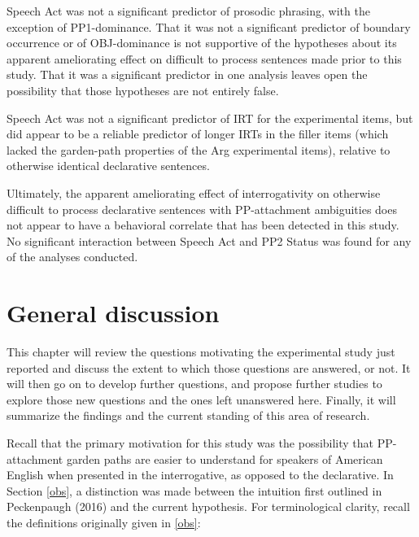 \documentclass[11pt,oneside]{book}
\begin{document}
Speech Act was not a significant predictor of prosodic phrasing, with the exception of PP1-dominance. That it was not a significant predictor of boundary occurrence or of OBJ-dominance is not supportive of the hypotheses about its apparent ameliorating effect on difficult to process sentences made prior to this study. That it was a significant predictor in one analysis leaves open the possibility that those hypotheses are not entirely false.

Speech Act was not a significant predictor of IRT for the experimental items, but did appear to be a reliable predictor of longer IRTs in the filler items (which lacked the garden-path properties of the Arg experimental items), relative to otherwise identical declarative sentences.

Ultimately, the apparent ameliorating effect of interrogativity on otherwise difficult to process declarative sentences with PP-attachment ambiguities does not appear to have a behavioral correlate that has been detected in this study. No significant interaction between Speech Act and PP2 Status was found for any of the analyses conducted.

\clearpage

\hypertarget{general-discussion}{%
\chapter{General discussion}\label{general-discussion}}

\setlength\parindent{24pt}\setlength{\parskip}{0.0pt plus 1.0pt}

This chapter will review the questions motivating the experimental study just reported and discuss the extent to which those questions are answered, or not. It will then go on to develop further questions, and propose further studies to explore those new questions and the ones left unanswered here. Finally, it will summarize the findings and the current standing of this area of research.

Recall that the primary motivation for this study was the possibility that PP-attachment garden paths are easier to understand for speakers of American English when presented in the interrogative, as opposed to the declarative. In Section \ref{obs}, a distinction was made between the intuition first outlined in Peckenpaugh (2016) and the current hypothesis. For terminological clarity, recall the definitions originally given in \ref{obs}:
\end{document}
